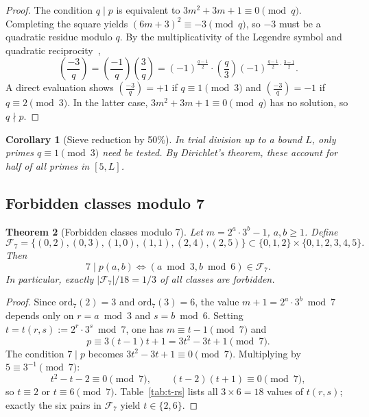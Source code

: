 \documentclass[11pt,a4paper]{article}
\theoremstyle{plain}
\newtheorem{theorem}{Theorem}[section]
\newtheorem{corollary}[theorem]{Corollary}
\theoremstyle{definition}
\begin{document}
\begin{proof}
The condition $q \mid p$ is equivalent to $3m^2 + 3m + 1 \equiv 0 \pmod{q}$.
Completing the square yields $(6m + 3)^2 \equiv -3 \pmod{q}$, so $-3$ must be
a quadratic residue modulo $q$. By the multiplicativity of the Legendre symbol
and quadratic reciprocity~\cite{ireland-rosen},
\[
\left(\frac{-3}{q}\right)
= \left(\frac{-1}{q}\right)\left(\frac{3}{q}\right)
= (-1)^{\frac{q-1}{2}} \cdot \left(\frac{q}{3}\right) (-1)^{\frac{q-1}{2} \cdot \frac{3-1}{2}}.
\]
A direct evaluation shows $\left(\frac{-3}{q}\right) = +1$ if
$q \equiv 1 \pmod{3}$ and $\left(\frac{-3}{q}\right) = -1$ if
$q \equiv 2 \pmod{3}$. In the latter case, $3m^2 + 3m + 1 \equiv 0 \pmod{q}$
has no solution, so $q \nmid p$.
\end{proof}

\begin{corollary}[Sieve reduction by 50\%]\label{cor:cubic}
In trial division up to a bound $L$, only primes $q \equiv 1 \pmod{3}$ need
be tested. By Dirichlet's theorem, these account for half of all primes in
$[5, L]$.
\end{corollary}

\subsection{Forbidden classes modulo 7}

\begin{rigorousbox}
\begin{theorem}[Forbidden classes modulo 7]\label{thm:mod7}
Let $m = 2^a \cdot 3^b - 1$, $a, b \ge 1$. Define
\[
\mathcal{F}_7 = \bigl\{(0, 2), (0, 3), (1, 0), (1, 1), (2, 4), (2, 5)\bigr\}
\subset \{0, 1, 2\} \times \{0, 1, 2, 3, 4, 5\}.
\]
Then
\[
7 \mid p(a, b) \iff (a \bmod 3, b \bmod 6) \in \mathcal{F}_7.
\]
In particular, exactly $|\mathcal{F}_7|/18 = 1/3$ of all classes are forbidden.
\end{theorem}
\end{rigorousbox}

\begin{proof}
Since $\mathrm{ord}_7(2) = 3$ and $\mathrm{ord}_7(3) = 6$, the value
$m + 1 = 2^a \cdot 3^b \bmod 7$ depends only on $r = a \bmod 3$ and
$s = b \bmod 6$. Setting $t = t(r, s) := 2^r \cdot 3^s \bmod 7$, one has
$m \equiv t - 1 \pmod{7}$ and
\[
p \equiv 3(t-1)t + 1 = 3t^2 - 3t + 1 \pmod{7}.
\]
The condition $7 \mid p$ becomes $3t^2 - 3t + 1 \equiv 0 \pmod{7}$.
Multiplying by $5 \equiv 3^{-1} \pmod{7}$:
\[
t^2 - t - 2 \equiv 0 \pmod{7}, \qquad (t-2)(t+1) \equiv 0 \pmod{7},
\]
so $t \equiv 2$ or $t \equiv 6 \pmod{7}$. Table~\ref{tab:t-rs} lists all
$3 \times 6 = 18$ values of $t(r, s)$; exactly the six pairs in $\mathcal{F}_7$
yield $t \in \{2, 6\}$.
\end{proof}
\end{document}
